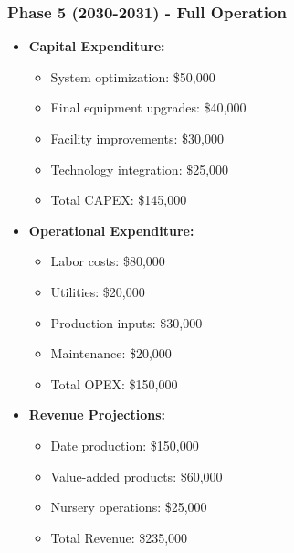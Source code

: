 \subsubsection{Phase 5 (2030-2031) - Full Operation}
\begin{itemize}
    \item \textbf{Capital Expenditure:}
    \begin{itemize}
        \item System optimization: \$50,000
        \item Final equipment upgrades: \$40,000
        \item Facility improvements: \$30,000
        \item Technology integration: \$25,000
        \item Total CAPEX: \$145,000
    \end{itemize}
    \item \textbf{Operational Expenditure:}
    \begin{itemize}
        \item Labor costs: \$80,000
        \item Utilities: \$20,000
        \item Production inputs: \$30,000
        \item Maintenance: \$20,000
        \item Total OPEX: \$150,000
    \end{itemize}
    \item \textbf{Revenue Projections:}
    \begin{itemize}
        \item Date production: \$150,000
        \item Value-added products: \$60,000
        \item Nursery operations: \$25,000
        \item Total Revenue: \$235,000
    \end{itemize}
\end{itemize}

